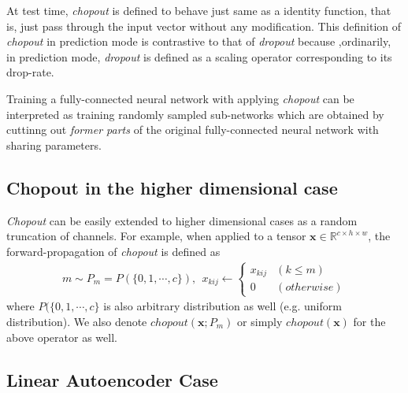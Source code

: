 \documentclass{article}
\begin{document}
    At test time, \textit{chopout} is defined to behave just same as a identity function, that is, just pass through the input vector without any modification. This definition of \textit{chopout} in prediction mode is contrastive to that of \textit{dropout} because ,ordinarily, in prediction mode, \textit{dropout} is defined as a scaling operator corresponding to its drop-rate.
    
    Training a fully-connected neural network with applying \textit{chopout} can be interpreted as training randomly sampled sub-networks which are obtained by cuttinng out \textit{former parts} of the original fully-connected neural network with sharing parameters.

    \subsection{Chopout in the higher dimensional case}
    \label{subsec:chopout-nd}
    
    \textit{Chopout} can be easily extended to higher dimensional cases as a random truncation of channels. 
    For example, when applied to a tensor $\mathbf{x} \in 
    \mathbb{R}^{c \times h \times w}$, the forward-propagation of \textit{chopout} is defined as
    \begin{align}
        m \sim P_m = P(\{0, 1, \cdots, c\}), \ \ 
        x_{kij} \leftarrow \begin{cases}
            x_{kij} & (k \leq m) \\
            0 & (otherwise)
            \end{cases} \nonumber
    \end{align}
    where $P(\{0, 1, \cdots, c\}$ is also arbitrary distribution as well (e.g. uniform distribution). We also denote $chopout(\mathbf{x}; P_m)$ or simply $chopout(\mathbf{x})$ for the above operator as well.

    \subsection{Linear Autoencoder Case}
    \label{subsec:linae}
    
\end{document}
